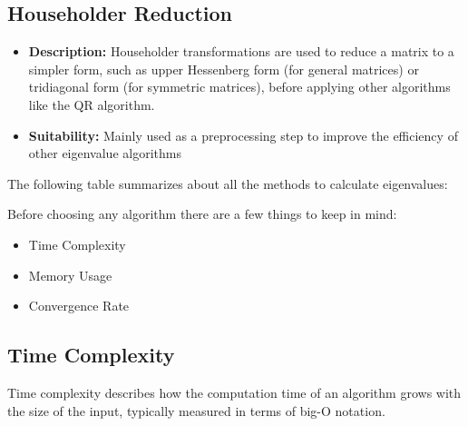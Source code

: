 \documentclass[journal]{IEEEtran}
\begin{document}
\subsection*{\textbf{Householder Reduction}}
\begin{itemize}
    \item \textbf{Description:} Householder transformations are used to reduce a matrix to a simpler form, such as upper Hessenberg form (for general matrices) or tridiagonal form (for symmetric matrices), before applying other algorithms like the QR algorithm.
    \item \textbf{Suitability:} Mainly used as a preprocessing step to improve the efficiency of other eigenvalue algorithms
\end{itemize}
The following table summarizes about all the methods to calculate eigenvalues:
\begin{table}[H]
\centering
\renewcommand{\arraystretch}{1.5}
\end{table}
Before choosing any algorithm there are a few things to keep in mind:
\begin{itemize}
    \item Time Complexity
    \item Memory Usage
    \item Convergence Rate
\end{itemize}

\subsection*{Time Complexity}
Time complexity describes how the computation time of an algorithm grows with the size of the input, typically measured in terms of big-O notation.
\end{document}

